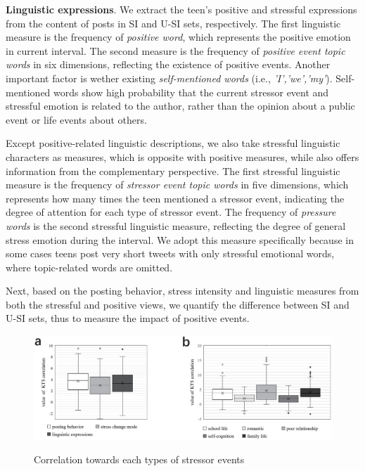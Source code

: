 \textbf{Linguistic expressions}.
We extract the teen's positive and stressful expressions from the content of posts in SI and U-SI sets, respectively.
The first linguistic measure is the frequency of \emph{positive word},
which represents the positive emotion in current interval.
The second measure is the frequency of \emph{positive event topic words} in six dimensions,
reflecting the existence of positive events.
Another important factor is wether existing \emph{self-mentioned words} (i.e., \emph{'I','we','my'}).
Self-mentioned words show high probability that the current stressor event and stressful emotion is related to the author,
rather than the opinion about a public event or life events about others.

Except positive-related linguistic descriptions, we also take stressful linguistic characters as measures,
which is opposite with positive measures, while also offers information from the complementary perspective.
The first stressful linguistic measure is the frequency of \emph{stressor event topic words} in five dimensions,
which represents how many times the teen mentioned a stressor event,
indicating the degree of attention for each type of stressor event.
The frequency of \emph{pressure words} is the second stressful linguistic measure,
reflecting the degree of general stress emotion during the interval.
We adopt this measure specifically because in some cases teens post very short tweets with only stressful emotional words,
where topic-related words are omitted.

Next,
based on the posting behavior, stress intensity and linguistic measures from both the stressful and positive views,
we quantify the difference between SI and U-SI sets, thus to measure the impact of positive events.

\begin{figure}
\centering
\caption{Correlation towards each types of stressor events}
\includegraphics[width=0.8\linewidth]{figs/BOX.eps}%
\label{fig:correlation}
\end{figure}

